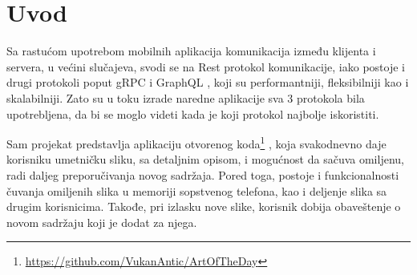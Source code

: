 \documentclass[12pt,oneside]{memoir}
\begin{document}
\frontmatter
\naslovna
\komisija
\apstrakt
\tableofcontents*

\mainmatter

\chapter{Uvod}
\label{ch:uvod}
Sa rastućom upotrebom mobilnih aplikacija komunikacija između klijenta i servera, u većini slučajeva, svodi se 
na Rest \cite{fielding2000} protokol komunikacije, iako postoje i drugi protokoli poput gRPC \cite{grpc-docs} i GraphQL \cite{graphql-spec}, koji 
su performantniji, 
fleksibilniji kao i skalabilniji. Zato su u toku izrade naredne aplikacije sva 3 protokola bila upotrebljena, da bi se moglo videti
 kada je koji protokol najbolje iskoristiti.


 Sam projekat predstavlja aplikaciju otvorenog koda\footnote{\url{https://github.com/VukanAntic/ArtOfTheDay}}
, koja svakodnevno daje
 korisniku umetničku sliku, sa detaljnim opisom, i mogućnost
  da sačuva omiljenu, radi daljeg preporučivanja novog sadržaja. 
  Pored toga, postoje i funkcionalnosti čuvanja omiljenih slika 
  u memoriji sopstvenog telefona, kao i deljenje slika sa drugim 
  korisnicima. Takođe, pri izlasku nove slike, korisnik dobija obaveštenje 
  o novom sadržaju koji je dodat za njega.
\end{document}
